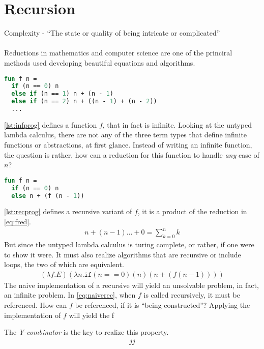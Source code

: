 \documentclass[11pt,oneside,a4paper]{report}
\begin{document}
\section{Recursion}
Complexity - ``The state or quality of being intricate or complicated''
\\\\
\noindent Reductions in mathematics and computer science are one of the princiral methods used developing beautiful equations and algorithms.
\begin{lstlisting}[language=ML,caption={Infinite program},label={lst:infprog},xleftmargin=.32\textwidth]
fun f n = 
  if (n == 0) n
  else if (n == 1) n + (n - 1)
  else if (n == 2) n + ((n - 1) + (n - 2))
  ...
\end{lstlisting}
\autoref{lst:infprog} defines a function $f$, that in fact is infinite.
Looking at the untyped lambda calculus, there are not any of the three term types that define infinite functions or abstractions, at first glance.
Instead of writing an infinite function, the question is rather, how can a reduction for this function to handle \textit{any} case of $n$?
\begin{lstlisting}[language=ML,caption={Recursive program},label={lst:recprog},xleftmargin=.32\textwidth]
fun f n = 
  if (n == 0) n
  else n + (f (n - 1))
\end{lstlisting}
\autoref{lst:recprog} defines a recursive variant of $f$, it is a product of the reduction in \autoref{eq:fred}.
\begin{align}
    n + (n - 1) \dots + 0 = \sum_{k = 0}^n k
    \label{eq:fred}
\end{align}
But since the untyped lambda calculus is turing complete, or rather, if one were to show it were.
It must also realize algorithms that are recursive or include loops, the two of which are equivalent.
\begin{align}
    (\lambda f . E) (\lambda n . \texttt{if} (n == 0) (n) (n + (f (n - 1))))
    \label{eq:naiverec}
\end{align}
The naive implementation of a recursive will yield an unsolvable problem, in fact, an infinite problem.
In \autoref{eq:naiverec}, when $f$ is called recursively, it must be referenced.
How can $f$ be referenced, if it is ``being constructed''?
Applying the implementation of $f$ will yield the f

The \textit{Y-combinator} is the key to realize this property.
\begin{align}
    jj
    \label{eq:ycomb}
\end{align}
\end{document}
